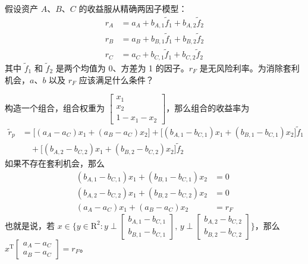 \begin{problem}
 假设资产 $A$、$B$、$C$ 的收益服从精确两因子模型：
\begin{align}
    r_{A}&=a_{A}+b_{A,1}\tilde{f}_{1}+b_{A,2}\tilde{f}_{2}\tag{14.1}\\
    r_{B}&=a_{B}+b_{B,1}\tilde{f}_{1}+b_{B,2}\tilde{f}_{2}\tag{14.2}\\
    r_{C}&=a_{C}+b_{C,1}\tilde{f}_{1}+b_{C,2}\tilde{f}_{2}\tag{14.3}
\end{align}
其中 $\tilde{f}_{1}$ 和 $\tilde{f}_{2}$ 是两个均值为 0、方差为 1 的因子。$r_{F}$ 是无风险利率。为消除套利机会，$a$、$b$ 以及 $r_{F}$ 应该满足什么条件？
\end{problem}
\begin{solution}
构造一个组合，组合权重为 $\begin{bmatrix}x_{1} \\ x_{2} \\ 1-x_{1}-x_{2}\end{bmatrix}$，那么组合的收益率为
\[
    \begin{aligned}
        \tilde{r}_{p}&=\bigl[(a_{A}-a_{C})x_{1}+(a_{B}-a_{C})x_{2}\bigr]+\bigl[(b_{A,1}-b_{C,1})x_{1}+(b_{B,1}-b_{C,1})x_{2}\bigr]\tilde{f}_{1}\\
        &\quad+\bigl[(b_{A,2}-b_{C,2})x_{1}+(b_{B,2}-b_{C,2})x_{2}\bigr]\tilde{f}_{2}
    \end{aligned}
\]
如果不存在套利机会，那么
\[
    \begin{aligned}
        (b_{A,1}-b_{C,1})x_{1}+(b_{B,1}-b_{C,1})x_{2}&=0\\
        (b_{A,2}-b_{C,2})x_{1}+(b_{B,2}-b_{C,2})x_{2}&=0\\
        (a_{A}-a_{C})x_{1}+(a_{B}-a_{C})x_{2}&=r_{F}
    \end{aligned}
\]
也就是说，若 $x\in\{y\in\mathrm{R}^{2}:y\perp\begin{bmatrix}b_{A,1}-b_{C,1} \\ b_{B,1}-b_{C,1}\end{bmatrix},\,y\perp\begin{bmatrix}b_{A,2}-b_{C,2} \\ b_{B,2}-b_{C,2}\end{bmatrix}\}$，那么 $x^{\mathrm{T}}\begin{bmatrix}a_{A}-a_{C} \\ a_{B}-a_{C}\end{bmatrix}=r_{F}$。
\end{solution}

